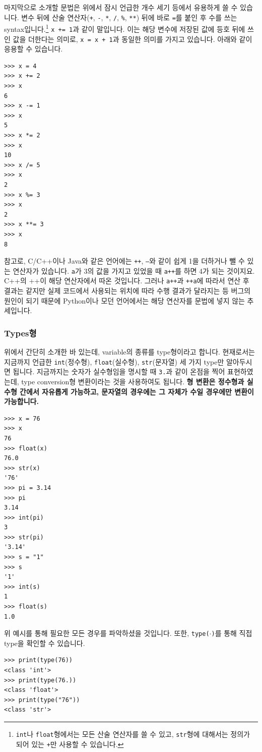 \documentclass[../main.tex]{subfiles}
\begin{document}
마지막으로 소개할 문법은 위에서 잠시 언급한 개수 세기 등에서 유용하게 쓸 수 있습니다.
변수 뒤에 산술 연산자(\texttt{+}, \texttt{-}, \texttt{*}, \texttt{/}, \texttt{\%}, \texttt{**}) 뒤에 바로 \texttt{=}를 붙인 후 수를 쓰는 syntax입니다.\footnote{\texttt{int}나 \texttt{float}형에서는 모든 산술 연산자를 쓸 수 있고, \texttt{str}형에 대해서는 정의가 되어 있는 \texttt{+}만 사용할 수 있습니다.}
\texttt{x += 1}과 같이 말입니다.
이는 해당 변수에 저장된 값에 등호 뒤에 쓰인 값을 더한다는 의미로, \texttt{x = x + 1}과 동일한 의미를 가지고 있습니다.
아래와 같이 응용할 수 있습니다.
\begin{verbatim}
>>> x = 4
>>> x += 2
>>> x
6
>>> x -= 1
>>> x
5
>>> x *= 2
>>> x
10
>>> x /= 5
>>> x
2
>>> x %= 3
>>> x
2
>>> x **= 3
>>> x
8
\end{verbatim}
참고로, C/C++이나 Java와 같은 언어에는 \texttt{++}, \texttt{--}와 같이 쉽게 1을 더하거나 뺄 수 있는 연산자가 있습니다.
\texttt{a}가 3의 값을 가지고 있었을 때 \texttt{a++}를 하면 4가 되는 것이지요.
C++의 ++이 해당 연산자에서 따온 것입니다.
그러나 \texttt{a++}과 \texttt{++a}에 따라서 연산 후 결과는 같지만 실제 코드에서 사용되는 위치에 따라 수행 결과가 달라지는 등 버그의 원인이 되기 때문에 Python이나 모던 언어에서는 해당 연산자를 문법에 넣지 않는 추세입니다.

\subsubsection{Types형}
위에서 간단히 소개한 바 있는데, variable의 종류를 type형이라고 합니다.
현재로서는 지금까지 언급한 \texttt{int}(정수형), \texttt{float}(실수형), \texttt{str}(문자열) 세 가지 type만 알아두시면 됩니다.
지금까지는 숫자가 실수형임을 명시할 때 \texttt{3.}과 같이 온점을 찍어 표현하였는데, type conversion형 변환이라는 것을 사용하여도 됩니다.
\textbf{형 변환은 정수형과 실수형 간에서 자유롭게 가능하고, 문자열의 경우에는 그 자체가 수일 경우에만 변환이 가능합니다.}
\begin{verbatim}
>>> x = 76
>>> x
76
>>> float(x)
76.0
>>> str(x)
'76'
>>> pi = 3.14
>>> pi
3.14
>>> int(pi)
3
>>> str(pi)
'3.14'
>>> s = "1"
>>> s
'1'
>>> int(s)
1
>>> float(s)
1.0
\end{verbatim}
위 예시를 통해 필요한 모든 경우를 파악하셨을 것입니다.
또한, \texttt{type($\cdot$)}를 통해 직접 type을 확인할 수 있습니다.
\begin{verbatim}
>>> print(type(76))
<class 'int'>
>>> print(type(76.))
<class 'float'>
>>> print(type("76"))
<class 'str'>
\end{verbatim}
\end{document}
